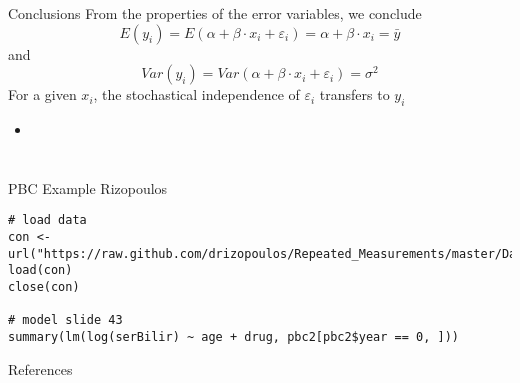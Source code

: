 \documentclass{beamer}
\begin{document}
\begin{frame}{Conclusions}
  From the properties of the error variables, we conclude
\[
  E(y_i) = E(\alpha + \beta \cdot x_i + \varepsilon_i) =
  \alpha + \beta \cdot x_i = \bar{y}
\]
and
\[
  Var(y_i) = Var(\alpha + \beta \cdot x_i + \varepsilon_i) = \sigma^2
\]
For a given $x_i$, the stochastical independence of $\varepsilon_i$
  transfers to $y_i$\\[2ex]
\end{frame}

\begin{frame}{}
  \begin{itemize}
    \item 
  \end{itemize}
\end{frame}

\section{}

% 
{

\begin{frame}[fragile]{PBC Example Rizopoulos}
\begin{lstlisting}
# load data
con <- url("https://raw.github.com/drizopoulos/Repeated_Measurements/master/Data.RData")
load(con)
close(con)

# model slide 43
summary(lm(log(serBilir) ~ age + drug, pbc2[pbc2$year == 0, ]))

\end{lstlisting}
\end{frame}

}

% 

\appendix
\begin{frame}{References}
\renewcommand{\bibfont}{\footnotesize}


\vfill
\end{frame}
\end{document}
